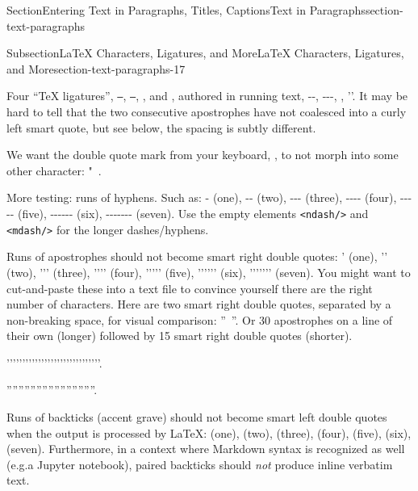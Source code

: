 \documentclass[twoside,10pt,]{article}
\newcommand{\mono}[1]{\texttt{#1}}
\numberwithin{equation}{section}
\begin{document}
\begin{sectionptx}{Section}{Entering Text in Paragraphs, Titles, Captions}{}{Text in Paragraphs}{}{}{section-text-paragraphs}
\begin{subsectionptx}{Subsection}{\LaTeX{} Characters, Ligatures, and More}{}{\LaTeX{} Characters, Ligatures, and More}{}{}{section-text-paragraphs-17}
\par
Four ``\TeX{} ligatures'', \mono{--}, \mono{---}, \mono{\textasciigrave{}\textasciigrave{}}, and \mono{\textquotesingle{}\textquotesingle{}}, authored in running text, -{}-{}, -{}-{}-, \textasciigrave{}\textasciigrave{}, '{}'{}.  It may be hard to tell that the two consecutive apostrophes have not coalesced into a curly left smart quote, but see below, the spacing is subtly different.%
\par
We want the double quote mark from your keyboard, \mono{\textquotedbl{}}, to not morph into some other character: "~.%
\par
More testing: runs of hyphens.  Such as: - (one), -{}-{} (two), -{}-{}- (three), -{}-{}-{}-{} (four), -{}-{}-{}-{}- (five), -{}-{}-{}-{}-{}-{} (six), -{}-{}-{}-{}-{}-{}- (seven).  Use the empty elements \mono{<ndash/>} and \mono{<mdash/>} for the longer dashes\slash{}hyphens.%
\par
Runs of apostrophes should not become smart right double quotes:  ' (one), '{}'{} (two), '{}'{}' (three), '{}'{}'{}'{} (four), '{}'{}'{}'{}' (five), '{}'{}'{}'{}'{}'{} (six), '{}'{}'{}'{}'{}'{}' (seven).    You might want to cut-and-paste these into a text file to convince yourself there are the right number of characters.  Here are two smart right double quotes, separated by a non-breaking space, for visual comparison: ''~''.  Or 30 apostrophes on a line of their own (longer) followed by 15 smart right double quotes (shorter).%
\par
'{}'{}'{}'{}'{}'{}'{}'{}'{}'{}'{}'{}'{}'{}'{}'{}'{}'{}'{}'{}'{}'{}'{}'{}'{}'{}'{}'{}'{}'{}.%
\par
''''''''''''''''''''''''''''''.%
\par
Runs of backticks (accent grave) should not become smart left double quotes when the output is processed by \LaTeX{}:  \textasciigrave{} (one), \textasciigrave{}\textasciigrave{} (two), \textasciigrave{}\textasciigrave{}\textasciigrave{} (three), \textasciigrave{}\textasciigrave{}\textasciigrave{}\textasciigrave{} (four), \textasciigrave{}\textasciigrave{}\textasciigrave{}\textasciigrave{}\textasciigrave{} (five), \textasciigrave{}\textasciigrave{}\textasciigrave{}\textasciigrave{}\textasciigrave{}\textasciigrave{} (six), \textasciigrave{}\textasciigrave{}\textasciigrave{}\textasciigrave{}\textasciigrave{}\textasciigrave{}\textasciigrave{} (seven).  Furthermore, in a context where Markdown syntax is recognized as well (e.g.\@ a Jupyter notebook), paired backticks should \emph{not} produce \textasciigrave{}inline verbatim text\textasciigrave{}.%

\end{subsectionptx}
\end{sectionptx}
\end{document}
